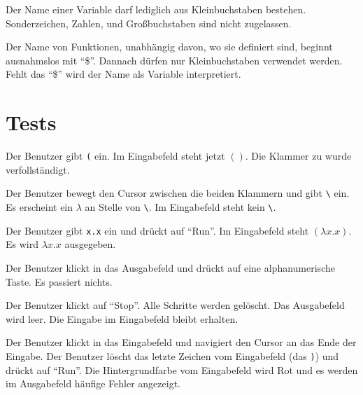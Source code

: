 \documentclass[parskip=full,11pt,twoside]{scrartcl}
\begin{document}
Der Name einer Variable darf lediglich aus Kleinbuchstaben bestehen. Sonderzeichen, Zahlen, und Großbuchstaben sind nicht zugelassen.

Der Name von Funktionen, unabhängig davon, wo sie definiert sind, beginnt ausnahmslos mit \enquote {\$}. Dannach dürfen nur Kleinbuchstaben verwendet werden. Fehlt das \enquote {\$} wird der Name als Variable interpretiert.

\newpage
\section{Tests}

{Der Benutzer gibt \texttt{(} ein.}
{Im Eingabefeld steht jetzt $()$. Die Klammer zu wurde verfollständigt.}

{Der Benutzer bewegt den Cursor zwischen die beiden Klammern und gibt \texttt{\textbackslash} ein.}
{Es erscheint ein $\lambda$ an Stelle von \texttt{\textbackslash}. Im Eingabefeld steht kein \texttt{\textbackslash}.}

{Der Benutzer gibt \texttt{x.x} ein und drückt auf \enquote{Run}.}
{Im Eingabefeld steht $(\lambda x.x)$. Es wird $\lambda x.x$ ausgegeben.}

{Der Benutzer klickt in das Ausgabefeld und drückt auf eine alphanumerische Taste.}
{Es passiert nichts.}

{Der Benutzer klickt auf \enquote{Stop}.}
{Alle Schritte werden gelöscht. Das Ausgabefeld wird leer. Die Eingabe im Eingabefeld bleibt erhalten.}

{Der Benutzer klickt in das Eingabefeld und navigiert den Cursor an das Ende der Eingabe.
Der Benutzer löscht das letzte Zeichen vom Eingabefeld (das \texttt{)}) und drückt auf \enquote{Run}.}
{Die Hintergrundfarbe vom Eingabefeld wird Rot und es werden im Ausgabefeld häufige Fehler angezeigt.}
\end{document}
